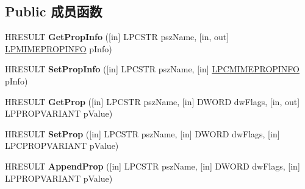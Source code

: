 \subsection*{Public 成员函数}
\begin{DoxyCompactItemize}
\item 
\mbox{\label{interface_m_i_m_e_o_l_e_1_1_i_mime_property_set_a95a42de20cf3b69ed668c668d4bf7d64}} 
H\+R\+E\+S\+U\+LT {\bfseries Get\+Prop\+Info} (\mbox{[}in\mbox{]} L\+P\+C\+S\+TR psz\+Name, \mbox{[}in, out\mbox{]} \hyperlink{struct_m_i_m_e_o_l_e_1_1_i_mime_property_set_1_1tag_m_i_m_e_p_r_o_p_i_n_f_o}{L\+P\+M\+I\+M\+E\+P\+R\+O\+P\+I\+N\+FO} p\+Info)
\item 
\mbox{\label{interface_m_i_m_e_o_l_e_1_1_i_mime_property_set_ac84d7f1d17b2ddd806f8a8b921fe2905}} 
H\+R\+E\+S\+U\+LT {\bfseries Set\+Prop\+Info} (\mbox{[}in\mbox{]} L\+P\+C\+S\+TR psz\+Name, \mbox{[}in\mbox{]} \hyperlink{struct_m_i_m_e_o_l_e_1_1_i_mime_property_set_1_1tag_m_i_m_e_p_r_o_p_i_n_f_o}{L\+P\+C\+M\+I\+M\+E\+P\+R\+O\+P\+I\+N\+FO} p\+Info)
\item 
\mbox{\label{interface_m_i_m_e_o_l_e_1_1_i_mime_property_set_a8f2502ccb4bc9dc390972e5244221a6d}} 
H\+R\+E\+S\+U\+LT {\bfseries Get\+Prop} (\mbox{[}in\mbox{]} L\+P\+C\+S\+TR psz\+Name, \mbox{[}in\mbox{]} D\+W\+O\+RD dw\+Flags, \mbox{[}in, out\mbox{]} L\+P\+P\+R\+O\+P\+V\+A\+R\+I\+A\+NT p\+Value)
\item 
\mbox{\label{interface_m_i_m_e_o_l_e_1_1_i_mime_property_set_add91cf124f917c8afd8cda1b9d6306e3}} 
H\+R\+E\+S\+U\+LT {\bfseries Set\+Prop} (\mbox{[}in\mbox{]} L\+P\+C\+S\+TR psz\+Name, \mbox{[}in\mbox{]} D\+W\+O\+RD dw\+Flags, \mbox{[}in\mbox{]} L\+P\+C\+P\+R\+O\+P\+V\+A\+R\+I\+A\+NT p\+Value)
\item 
\mbox{\label{interface_m_i_m_e_o_l_e_1_1_i_mime_property_set_ab60f6f8442d6d3d18ee01cbe03f4386a}} 
H\+R\+E\+S\+U\+LT {\bfseries Append\+Prop} (\mbox{[}in\mbox{]} L\+P\+C\+S\+TR psz\+Name, \mbox{[}in\mbox{]} D\+W\+O\+RD dw\+Flags, \mbox{[}in\mbox{]} L\+P\+P\+R\+O\+P\+V\+A\+R\+I\+A\+NT p\+Value)
\item 
\mbox{\label{interface_m_i_m_e_o_l_e_1_1_i_mime_property_set_ae66d88a278f82b0b24a07064b2f541c1}} 

\end{DoxyCompactItemize}
